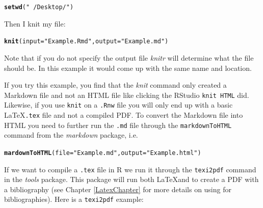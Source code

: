 \documentclass[ChapterTOCs,krantz1]{krantz}\usepackage{graphicx, color}
\makeatletter
\newcommand{\hlfunctioncall}[1]{\textcolor[rgb]{0.501960784313725,0,0.329411764705882}{\textbf{#1}}}%
\newcommand{\hlstring}[1]{\textcolor[rgb]{0.6,0.6,1}{#1}}%
\newenvironment{kframe}{%
 \def\at@end@of@kframe{}%
 \ifinner\ifhmode%
  \def\at@end@of@kframe{\end{minipage}}%
  \begin{minipage}{\columnwidth}%
 \fi\fi%
 \def\FrameCommand##1{\hskip\@totalleftmargin \hskip-\fboxsep
 \colorbox{shadecolor}{##1}\hskip-\fboxsep
     \hskip-\linewidth \hskip-\@totalleftmargin \hskip\columnwidth}%
 \MakeFramed {\advance\hsize-\width
   \@totalleftmargin\z@ \linewidth\hsize
   \@setminipage}}%
 {\par\unskip\endMakeFramed%
 \at@end@of@kframe}
\newenvironment{knitrout}{}{} %
\makeatother
\begin{document}
\begin{knitrout}
\color{fgcolor}\begin{kframe}
\begin{alltt}
\hlfunctioncall{setwd}(\hlstring{"~/Desktop/"})
\end{alltt}
\end{kframe}
\end{knitrout}


\noindent Then I knit my file:

\begin{knitrout}
\color{fgcolor}\begin{kframe}
\begin{alltt}
\hlfunctioncall{knit}(input = \hlstring{"Example.Rmd"}, output = \hlstring{"Example.md"})
\end{alltt}
\end{kframe}
\end{knitrout}


\noindent Note that if you do not specify the output file {\emph{knitr}} will determine what the file should be. In this example it would come up with the same name and location.

If you try this example, you find that the {\emph{knit}} command only created a Markdown file and not an HTML file like clicking the RStudio {\tt{knit HTML}} did. Likewise, if you use {\tt{knit}} on a {\tt{.Rnw}} file you will only end up with a basic \LaTeX {\tt{.tex}} file and not a compiled PDF. To convert the Markdown file into HTML you need to further run the {\tt{.md}} file through the {\tt{markdownToHTML}} command from the {\emph{markdown}} package, i.e.

\begin{knitrout}
\color{fgcolor}\begin{kframe}
\begin{alltt}
\hlfunctioncall{mardownToHTML}(file = \hlstring{"Example.md"}, output = \hlstring{"Example.html"})
\end{alltt}
\end{kframe}
\end{knitrout}


\noindent If we want to compile a {\tt{.tex}} file in R we run it through the {\tt{texi2pdf}} command in the {\emph{tools}} package. This package will run both \LaTeX and \BibTeX to create a PDF with a bibliography (see Chapter \ref{LatexChapter} for more details on using \BibTeX for bibliographies). Here is a {\tt{texi2pdf}} example:
\end{document}
